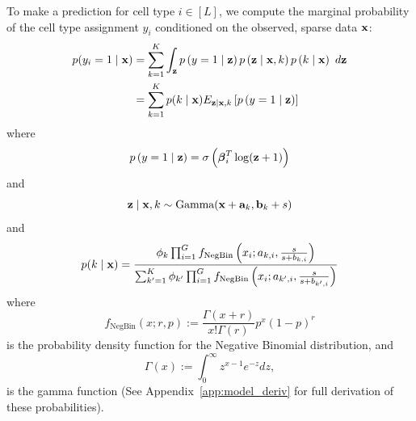 To make a prediction for cell type $i \in [L]$, we compute the marginal probability of the cell type assignment $y_i$ conditioned on the observed, sparse data $\bold{x}$:
\begin{align*}
p(y_i=1 \mid \bold{x}) &= \sum_{k=1}^K \int_{\bold{z}} p\left(y=1 \mid \bold{z}\right) p\left(\bold{z} \mid \bold{x}, k\right) p\left(k \mid \bold{x}\right) \ d\bold{z} \\
&= \sum_{k=1}^K p(k \mid \bold{x}) E_{\bold{z} \mid \bold{x}, k} \left[p\left(y=1 \mid \bold{z}\right)\right]
\end{align*}
where 
$$p\left(y=1 \mid \bold{z}\right) = \sigma\left(\boldsymbol{\beta}_i^T\log(\bold{z}+1)\right)$$
and
$$\bold{z} \mid \bold{x}, k \sim \text{Gamma}(\bold{x}+\bold{a}_k, \bold{b}_k + s)$$
and 
$$p(k \mid \bold{x}) = \frac{ \phi_k \prod_{i=1}^G f_{\text{NegBin}}\left(x_i ; a_{k,i}, \frac{s}{s + b_{k,i}} \right)}{\sum_{k'=1}^K \phi_{k'} \prod_{i=1}^G f_{\text{NegBin}}\left(x_i ; a_{k',i}, \frac{s}{s + b_{k',i}} \right)}$$
where
$$f_{\text{NegBin}}(x; r, p) := \frac{\Gamma(x + r)}{x! \Gamma(r)} p^x(1-p)^r$$ 
is the probability density function for the Negative Binomial distribution, and
$$\Gamma(x) := \int_{0}^{\infty} z^{x-1}e^{-z} dz,$$
is the gamma function  (See Appendix~\ref{app:model_deriv} for full derivation of these probabilities).  

